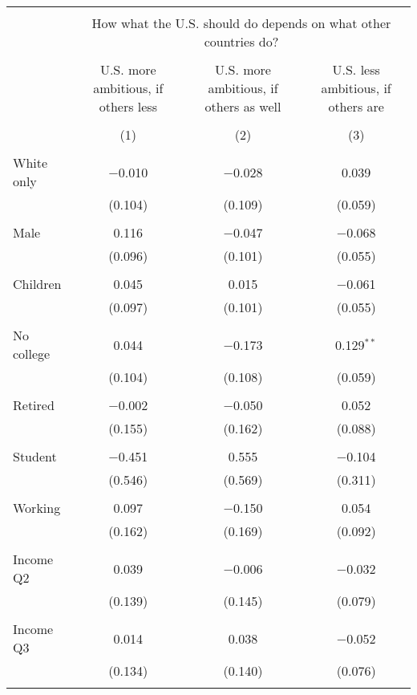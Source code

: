 
\begin{tabular}{@{\extracolsep{5pt}}lccc} 
\\[-1.8ex]\hline 
\hline \\[-1.8ex] 
 & \multicolumn{3}{c}{How what the U.S. should do depends on what other countries do?} \\ 
\cline{2-4} 
\\[-1.8ex] & U.S. more ambitious, if others less & U.S. more ambitious, if others as well & U.S. less ambitious, if others are \\ 
\\[-1.8ex] & (1) & (2) & (3)\\ 
\hline \\[-1.8ex] 
 White only & $-$0.010 & $-$0.028 & 0.039 \\ 
  & (0.104) & (0.109) & (0.059) \\ 
  & & & \\ 
 Male & 0.116 & $-$0.047 & $-$0.068 \\ 
  & (0.096) & (0.101) & (0.055) \\ 
  & & & \\ 
 Children & 0.045 & 0.015 & $-$0.061 \\ 
  & (0.097) & (0.101) & (0.055) \\ 
  & & & \\ 
 No college & 0.044 & $-$0.173 & 0.129$^{**}$ \\ 
  & (0.104) & (0.108) & (0.059) \\ 
  & & & \\ 
 Retired & $-$0.002 & $-$0.050 & 0.052 \\ 
  & (0.155) & (0.162) & (0.088) \\ 
  & & & \\ 
 Student & $-$0.451 & 0.555 & $-$0.104 \\ 
  & (0.546) & (0.569) & (0.311) \\ 
  & & & \\ 
 Working & 0.097 & $-$0.150 & 0.054 \\ 
  & (0.162) & (0.169) & (0.092) \\ 
  & & & \\ 
 Income Q2 & 0.039 & $-$0.006 & $-$0.032 \\ 
  & (0.139) & (0.145) & (0.079) \\ 
  & & & \\ 
 Income Q3 & 0.014 & 0.038 & $-$0.052 \\ 
  & (0.134) & (0.140) & (0.076) \\ 
  & & & \\ 

\end{tabular}
